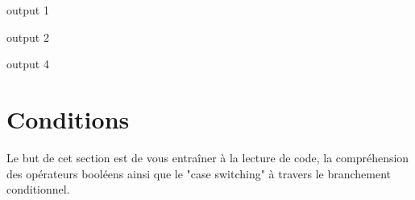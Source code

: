 \begin{Exercice}[5 minutes] 
    
    

    \begin{solution}
        output 1 
        
        output 2 
        
        output 4 \\
    \end{solution}
    
\end{Exercice}

\newpage
\section{Conditions}
Le but de cet section est de vous entraîner à la lecture de code, la compréhension des opérateurs booléens ainsi que le "case switching" à travers le branchement conditionnel.

